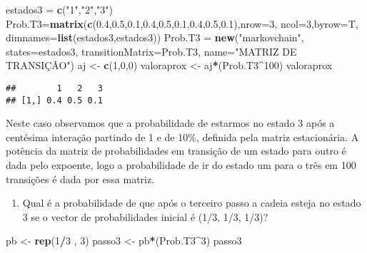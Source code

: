 \documentclass[
]{article}
\newenvironment{Shaded}{\begin{snugshade}}{\end{snugshade}}
\newcommand{\DataTypeTok}[1]{\textcolor[rgb]{0.13,0.29,0.53}{#1}}
\newcommand{\DecValTok}[1]{\textcolor[rgb]{0.00,0.00,0.81}{#1}}
\newcommand{\FloatTok}[1]{\textcolor[rgb]{0.00,0.00,0.81}{#1}}
\newcommand{\KeywordTok}[1]{\textcolor[rgb]{0.13,0.29,0.53}{\textbf{#1}}}
\newcommand{\NormalTok}[1]{#1}
\newcommand{\OperatorTok}[1]{\textcolor[rgb]{0.81,0.36,0.00}{\textbf{#1}}}
\newcommand{\StringTok}[1]{\textcolor[rgb]{0.31,0.60,0.02}{#1}}
\providecommand{\tightlist}{%
  \setlength{\itemsep}{0pt}\setlength{\parskip}{0pt}}
\begin{document}
\begin{Shaded}
\begin{Highlighting}[]
\NormalTok{estados3 =}\StringTok{ }\KeywordTok{c}\NormalTok{(}\StringTok{"1"}\NormalTok{,}\StringTok{"2"}\NormalTok{,}\StringTok{"3"}\NormalTok{)}
\NormalTok{Prob.T3=}\KeywordTok{matrix}\NormalTok{(}\KeywordTok{c}\NormalTok{(}\FloatTok{0.4}\NormalTok{,}\FloatTok{0.5}\NormalTok{,}\FloatTok{0.1}\NormalTok{,}\FloatTok{0.4}\NormalTok{,}\FloatTok{0.5}\NormalTok{,}\FloatTok{0.1}\NormalTok{,}\FloatTok{0.4}\NormalTok{,}\FloatTok{0.5}\NormalTok{,}\FloatTok{0.1}\NormalTok{),}\DataTypeTok{nrow=}\DecValTok{3}\NormalTok{,}
              \DataTypeTok{ncol=}\DecValTok{3}\NormalTok{,}\DataTypeTok{byrow=}\NormalTok{T, }\DataTypeTok{dimnames=}\KeywordTok{list}\NormalTok{(estados3,estados3))}
\NormalTok{Prob.T3 =}\StringTok{ }\KeywordTok{new}\NormalTok{(}\StringTok{"markovchain"}\NormalTok{, }\DataTypeTok{states=}\NormalTok{estados3, }\DataTypeTok{transitionMatrix=}\NormalTok{Prob.T3,}
            \DataTypeTok{name=}\StringTok{"MATRIZ DE TRANSIÇÃO"}\NormalTok{)}
\NormalTok{aj <-}\StringTok{ }\KeywordTok{c}\NormalTok{(}\DecValTok{1}\NormalTok{,}\DecValTok{0}\NormalTok{,}\DecValTok{0}\NormalTok{)}
\NormalTok{valoraprox <-}\StringTok{ }\NormalTok{aj}\OperatorTok{*}\NormalTok{(Prob.T3}\OperatorTok{^}\DecValTok{100}\NormalTok{)}
\NormalTok{valoraprox}
\end{Highlighting}
\end{Shaded}

\begin{verbatim}
##        1   2   3
## [1,] 0.4 0.5 0.1
\end{verbatim}

Neste caso observamos que a probabilidade de estarmos no estado 3 após a
centésima interação partindo de 1 e de 10\%, definida pela matriz
estacionária. A potência da matriz de probabilidades em transição de um
estado para outro é dada pelo expoente, logo a probabilidade de ir do
estado um para o três em 100 transições é dada por essa matriz.

\begin{enumerate}
\def\labelenumi{\alph{enumi})}
\setcounter{enumi}{1}
\tightlist
\item
  Qual é a probabilidade de que após o terceiro passo a cadeia esteja no
  estado 3 se o vector de probabilidades inicial é (1/3, 1/3, 1/3)?
\end{enumerate}

\begin{Shaded}
\begin{Highlighting}[]
\NormalTok{pb <-}\StringTok{ }\KeywordTok{rep}\NormalTok{(}\DecValTok{1}\OperatorTok{/}\DecValTok{3}\NormalTok{ , }\DecValTok{3}\NormalTok{)}
\NormalTok{passo3 <-}\StringTok{ }\NormalTok{pb}\OperatorTok{*}\NormalTok{(Prob.T3}\OperatorTok{^}\DecValTok{3}\NormalTok{)}
\NormalTok{passo3}
\end{Highlighting}
\end{Shaded}
\end{document}
